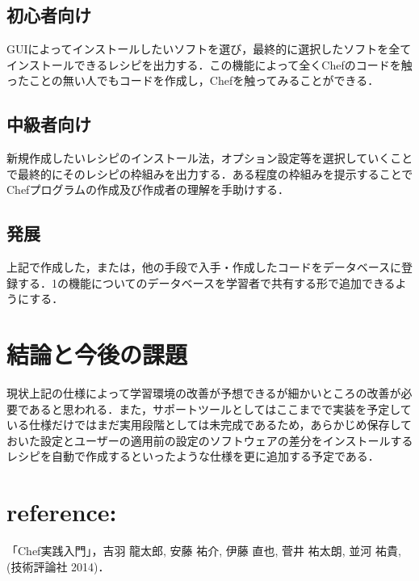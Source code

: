 \documentclass[a4j,twocolumn]{jsarticle}
\begin{document}
\subsection{初心者向け}
GUIによってインストールしたいソフトを選び，最終的に選択したソフトを全てインストールできるレシピを出力する．この機能によって全くChefのコードを触ったことの無い人でもコードを作成し，Chefを触ってみることができる．

\subsection{中級者向け}
新規作成したいレシピのインストール法，オプション設定等を選択していくことで最終的にそのレシピの枠組みを出力する．ある程度の枠組みを提示することでChefプログラムの作成及び作成者の理解を手助けする． 

\subsection{発展}
上記で作成した，または，他の手段で入手・作成したコードをデータベースに登録する．1の機能についてのデータベースを学習者で共有する形で追加できるようにする．

\section{結論と今後の課題}
現状上記の仕様によって学習環境の改善が予想できるが細かいところの改善が必要であると思われる．また，サポートツールとしてはここまでで実装を予定している仕様だけではまだ実用段階としては未完成であるため，あらかじめ保存しておいた設定とユーザーの適用前の設定のソフトウェアの差分をインストールするレシピを自動で作成するといったような仕様を更に追加する予定である．

\section{reference:}
「Chef実践入門」，吉羽 龍太郎, 安藤 祐介, 伊藤 直也, 菅井 祐太朗, 並河 祐貴,(技術評論社 2014)．
\end{document}
